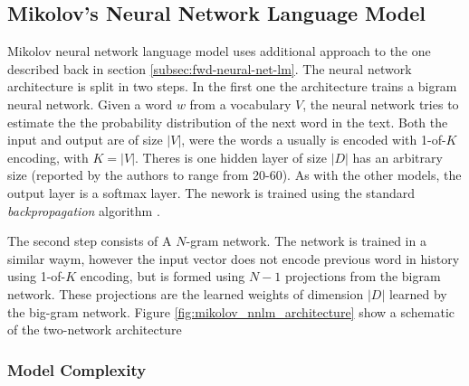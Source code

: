 

\subsection{Mikolov's Neural Network Language Model}
\label{sec:mikolov-neural-net-model}



Mikolov neural network language model uses additional approach to the one
described back in section \ref{subsec:fwd-neural-net-lm}.  The neural network
architecture is split in two steps. In the first one the architecture trains
a bigram neural network. Given a word $w$ from a vocabulary $V$, the neural
network tries to estimate the the probability distribution of the next word
in the text. Both the input and output are of size $|V|$, were the words a
usually is encoded with 1-of-$K$ encoding, with $K=|V|$.  Theres is one hidden layer of
size $|D|$ has an arbitrary size (reported by the authors  to range from 20-60). As with the
other models, the output layer  is a  softmax layer. The nework is trained
using the standard \textit{backpropagation} algorithm
\cite{conf/icassp/MikolovKBGC09}. 




The second step consists of  A $N$-gram network. The network is trained in a
similar waym, however the input vector does not encode previous word in
history using 1-of-$K$ encoding, but is formed using $N-1$ projections from
the  bigram network. These projections are the learned weights of dimension
$|D|$ learned by the big-gram network. Figure \ref{fig:mikolov_nnlm_architecture} show a schematic of the
two-network architecture 





\subsubsection{Model Complexity}

